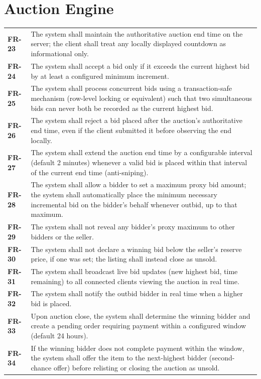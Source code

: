 \documentclass[11pt,a4paper]{report}
\newenvironment{reqtable}{\begin{longtable}{p{2.2cm}p{11.5cm}}}{\end{longtable}}
\begin{document}
\section{Auction Engine}
\begin{reqtable}
\textbf{FR-23} & The system shall maintain the authoritative auction end time on the server; the client shall treat any locally displayed countdown as informational only. \\
\textbf{FR-24} & The system shall accept a bid only if it exceeds the current highest bid by at least a configured minimum increment. \\
\textbf{FR-25} & The system shall process concurrent bids using a transaction-safe mechanism (row-level locking or equivalent) such that two simultaneous bids can never both be recorded as the current highest bid. \\
\textbf{FR-26} & The system shall reject a bid placed after the auction's authoritative end time, even if the client submitted it before observing the end locally. \\
\textbf{FR-27} & The system shall extend the auction end time by a configurable interval (default 2 minutes) whenever a valid bid is placed within that interval of the current end time (anti-sniping). \\
\textbf{FR-28} & The system shall allow a bidder to set a maximum proxy bid amount; the system shall automatically place the minimum necessary incremental bid on the bidder's behalf whenever outbid, up to that maximum. \\
\textbf{FR-29} & The system shall not reveal any bidder's proxy maximum to other bidders or the seller. \\
\textbf{FR-30} & The system shall not declare a winning bid below the seller's reserve price, if one was set; the listing shall instead close as unsold. \\
\textbf{FR-31} & The system shall broadcast live bid updates (new highest bid, time remaining) to all connected clients viewing the auction in real time. \\
\textbf{FR-32} & The system shall notify the outbid bidder in real time when a higher bid is placed. \\
\textbf{FR-33} & Upon auction close, the system shall determine the winning bidder and create a pending order requiring payment within a configured window (default 24 hours). \\
\textbf{FR-34} & If the winning bidder does not complete payment within the window, the system shall offer the item to the next-highest bidder (second-chance offer) before relisting or closing the auction as unsold. \\
\end{reqtable}
\end{document}
